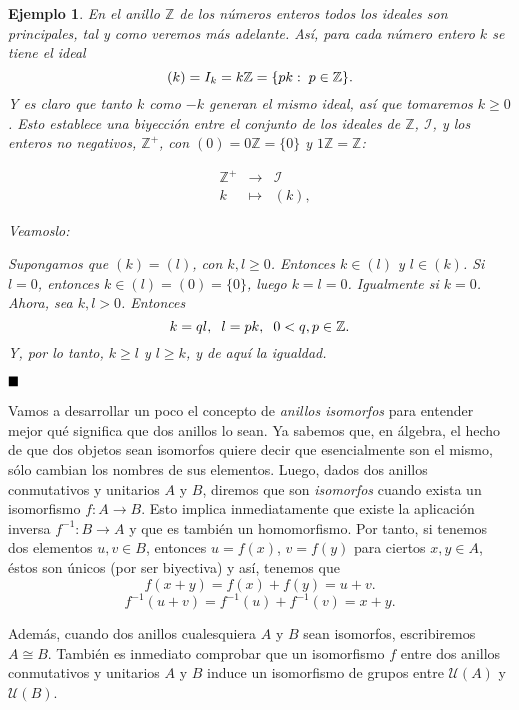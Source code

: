 \documentclass[12pt]{article}
\newtheorem{example}{Ejemplo}[theorem]
\begin{document}
\begin{example} En el anillo $\mathbb{Z}$ de los números enteros todos los ideales son principales, tal y como veremos más adelante. Así, para cada número entero $k$ se tiene el ideal $$(k) = I_{k} = k\mathbb{Z} = \lbrace pk : \hspace{0.1cm} p \in \mathbb{Z} \rbrace.$$ Y es claro que tanto $k$ como $-k$ generan el mismo ideal, así que tomaremos $k \geq 0$. Esto establece una biyección entre el conjunto de los ideales de $\mathbb{Z}$, $\mathcal{I}$, y los enteros no negativos, $\mathbb{Z}^+$, con $(0) = 0\mathbb{Z} = \lbrace 0 \rbrace$ y $1\mathbb{Z} = \mathbb{Z}$:

$$\begin{array}{rccl}
&\mathbb{Z}^+&\longrightarrow & \mathcal{I}\\
&k& \longmapsto &(k),
\end{array}
$$ 

Veamoslo:

Supongamos que $(k) = (l)$, con $k, l \geq 0$. Entonces $k \in (l)$ y $l \in (k)$. Si $l=0$, entonces $k \in (l) = (0) = \lbrace 0 \rbrace$, luego $k = l = 0$. Igualmente si $k = 0$. Ahora, sea $k,l > 0$. Entonces $$k = ql, \hspace{0.2cm} l = pk, \hspace{0.2cm} 0 < q, p \in \mathbb{Z}.$$ Y, por lo tanto, $k \geq l$ y $l \geq k$, y de aquí la igualdad.
\end{example}

$\hfill \blacksquare$

Vamos a desarrollar un poco el concepto de \textit{anillos isomorfos} para entender mejor qué significa que dos anillos lo sean. Ya sabemos que, en álgebra, el hecho de que dos objetos sean isomorfos quiere decir que esencialmente son el mismo, sólo cambian los nombres de sus elementos. Luego, dados dos anillos conmutativos y unitarios $A$ y $B$, diremos que son \textit{isomorfos} cuando exista un isomorfismo $f \colon A \longrightarrow B$. Esto implica inmediatamente que existe la aplicación inversa $f^{-1} \colon B \longrightarrow A$ y que es también un homomorfismo. Por tanto, si tenemos dos elementos $u,v \in B$, entonces $u=f(x)$, $v=f(y)$ para ciertos $x,y \in A$, éstos son únicos (por ser biyectiva) y así, tenemos que $$f(x+y)= f(x) + f(y) = u + v.$$ $$f^{-1}(u+v) = f^{-1}(u) + f^{-1}(v)= x + y.$$

Además, cuando dos anillos cualesquiera $A$ y $B$ sean isomorfos, escribiremos $A\cong B$. También es inmediato comprobar que un isomorfismo $f$ entre dos anillos conmutativos y unitarios $A$ y $B$ induce un isomorfismo de grupos entre $\mathcal{U}(A)$ y $\mathcal{U}(B)$.
\end{document}
